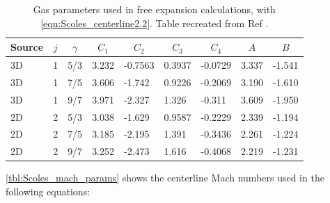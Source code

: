 \begin{table}[]
	\centering
	\begin{tabular}{lllllllll}
		\hline
		\multicolumn{1}{c}{Source} & \multicolumn{1}{c}{$j$} & \multicolumn{1}{c}{$\gamma$} & \multicolumn{1}{c}{$C_1$} & \multicolumn{1}{c}{$C_2$} & \multicolumn{1}{c}{$C_3$} & \multicolumn{1}{c}{$C_4$} & \multicolumn{1}{c}{$A$} & \multicolumn{1}{c}{$B$} \\ \hline
		3D                         & 1                     & 5/3                          & 3.232                     & -0.7563                   & 0.3937                    & -0.0729                   & 3.337                & -1.541                \\
		3D                         & 1                     & 7/5                          & 3.606                     & -1.742                    & 0.9226                    & -0.2069                   & 3.190                 & -1.610                \\
		3D                         & 1                     & 9/7                          & 3.971                     & -2.327                    & 1.326                     & -0.311                    & 3.609                 & -1.950                \\
		2D                         & 2                     & 5/3                          & 3.038                     & -1.629                    & 0.9587                    & -0.2229                   & 2.339                 & -1.194                \\
		2D                         & 2                     & 7/5                          & 3.185                     & -2.195                    & 1.391                     & -0.3436                   & 2.261                 & -1.224                \\
		2D                         & 2                     & 9/7                          & 3.252                     & -2.473                    & 1.616                     & -0.4068                   & 2.219                 & -1.231               
	\end{tabular}
	\caption{Gas parameters used in free expansion calculations, with \cref{eqn:Scoles_centerline2.2}. Table recreated from Ref \cite{millerFreeJetSources1988}.}
	\label{tbl:Scoles_gas_params2.2}
\end{table}


\cref{tbl:Scoles_mach_params} shows the centerline Mach numbers used in the following equations:

